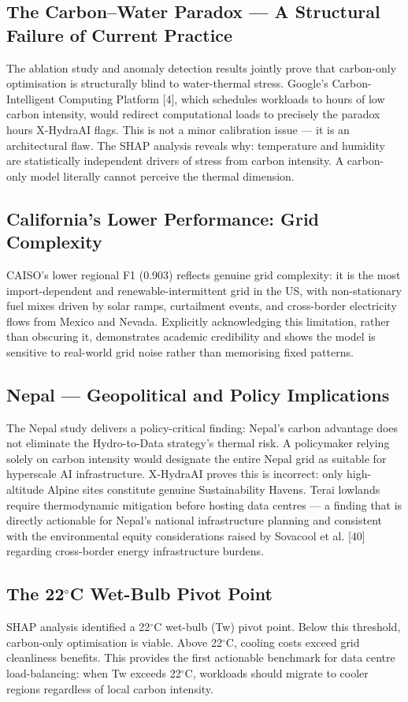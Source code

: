 \documentclass[conference]{IEEEtran}
\begin{document}
\subsection{The Carbon--Water Paradox — A Structural Failure of Current Practice}
The ablation study and anomaly detection results jointly prove that carbon-only optimisation is structurally blind to water-thermal stress. Google's Carbon-Intelligent Computing Platform [4], which schedules workloads to hours of low carbon intensity, would redirect computational loads to precisely the paradox hours X-HydraAI flags. This is not a minor calibration issue — it is an architectural flaw. The SHAP analysis reveals why: temperature and humidity are statistically independent drivers of stress from carbon intensity. A carbon-only model literally cannot perceive the thermal dimension.

\subsection{California's Lower Performance: Grid Complexity}
CAISO's lower regional F1 (0.903) reflects genuine grid complexity: it is the most import-dependent and renewable-intermittent grid in the US, with non-stationary fuel mixes driven by solar ramps, curtailment events, and cross-border electricity flows from Mexico and Nevada. Explicitly acknowledging this limitation, rather than obscuring it, demonstrates academic credibility and shows the model is sensitive to real-world grid noise rather than memorising fixed patterns.

\subsection{Nepal — Geopolitical and Policy Implications}
The Nepal study delivers a policy-critical finding: Nepal's carbon advantage does not eliminate the Hydro-to-Data strategy's thermal risk. A policymaker relying solely on carbon intensity would designate the entire Nepal grid as suitable for hyperscale AI infrastructure. X-HydraAI proves this is incorrect: only high-altitude Alpine sites constitute genuine Sustainability Havens. Terai lowlands require thermodynamic mitigation before hosting data centres — a finding that is directly actionable for Nepal's national infrastructure planning and consistent with the environmental equity considerations raised by Sovacool et al. [40] regarding cross-border energy infrastructure burdens.

\subsection{The 22$^\circ$C Wet-Bulb Pivot Point}
SHAP analysis identified a 22$^\circ$C wet-bulb (Tw) pivot point. Below this threshold, carbon-only optimisation is viable. Above 22$^\circ$C, cooling costs exceed grid cleanliness benefits. This provides the first actionable benchmark for data centre load-balancing: when Tw exceeds 22$^\circ$C, workloads should migrate to cooler regions regardless of local carbon intensity.
\end{document}
